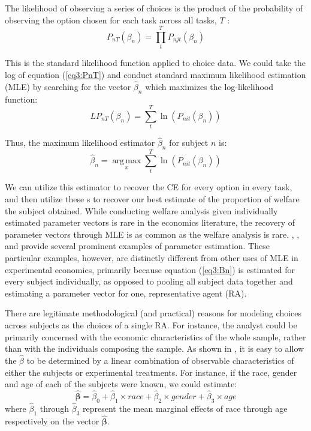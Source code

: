 \documentclass[../main.tex]{subfiles}
\begin{document}
The likelihood of observing a series of choices is the product of the probability of observing the option chosen for each task across all tasks, $T$ :
\begin{equation}
	\label{eq3:PnT}
	P_{nT}(\beta_n) =  \prod_{t}^{T} P_{njt}(\beta_n)
\end{equation}

\noindent This is the standard likelihood function applied to choice data.
We could take the log of equation (\ref{eq3:PnT}) and conduct standard maximum likelihood estimation (MLE) by searching for the vector $\hat{\beta}_n$ which maximizes the log-likelihood function:
\begin{equation}
	\label{eq3:LPnT}
	\mathit{LP}_{nT}(\beta_n) = \sum_{t}^{T} \ln \left( P_{nit}(\beta_n) \right)
\end{equation}

\noindent Thus, the maximum likelihood estimator $\hat{\beta}_n$ for subject $n$ is:
\begin{equation}
	\label{eq3:Bn}
	\hat{\beta}_n = \underset{x}{\operatorname{arg\,max}}\sum_t^T \ln \left( P_{nit}(\beta_n) \right)
\end{equation}

We can utilize this estimator to recover the CE for every option in every task, and then utilize these \CE s to recover our best estimate of the proportion of welfare the subject obtained. 
While conducting welfare analysis given individually estimated parameter vectors is rare in the economics literature,{\footnotemark} the recovery of parameter vectors through MLE is as common as the welfare analysis is rare.
\textcite{Hey1994}, \textcite{Wilcox2015}, and \textcite{Hey2001} provide several prominent examples of parameter estimation.
These particular examples, however, are distinctly different from other uses of MLE in experimental economics, primarily because equation (\ref{eq3:Bn}) is estimated for every subject individually, as opposed to pooling all subject data together and estimating a parameter vector for one, representative agent (RA).

\addtocounter{footnote}{-1}

There are legitimate methodological (and practical) reasons for modeling choices across subjects as the choices of a single RA.
For instance, the analyst could be primarily concerned with the economic characteristics of the whole sample, rather than with the individuals composing the sample.
As shown in \textcite[142]{Harrison2008a}, it is easy to allow the $\hat{\beta}$ to be determined by a linear combination of observable characteristics of either the subjects or experimental treatments.
For instance, if the race, gender and age of each of the subjects were known, we could estimate:
\begin{equation}
	\label{eq3:BB}
	\bm{\hat{\beta}} = \hat{\beta}_0 + \hat{\beta}_1 \times \mathit{race} + \hat{\beta}_2 \times \mathit{gender} + \hat{\beta}_3 \times \mathit{age}
\end{equation}
\noindent where $\hat{\beta}_1$ through $\hat{\beta}_3$ represent the mean marginal effects of race through age respectively on the vector $\bm{\hat{\beta}}$.
\end{document}
